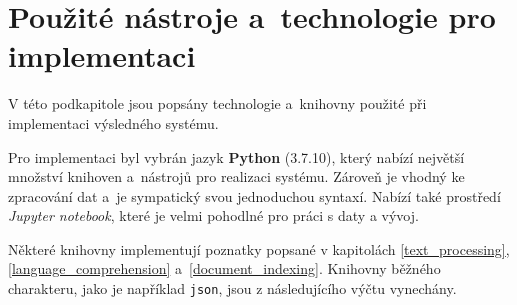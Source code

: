 \section{Použité nástroje a~technologie pro implementaci}
\label{pouzite_nastroje}
V této podkapitole jsou popsány technologie a~knihovny použité při implementaci výsledného systému.\par
Pro implementaci byl vybrán jazyk \textbf{Python} (3.7.10), který nabízí největší množství knihoven a~nástrojů pro realizaci systému. Zároveň je vhodný ke zpracování dat a~je sympatický svou jednoduchou syntaxí. Nabízí také prostředí \emph{Jupyter notebook}, které je velmi pohodlné pro práci s daty a vývoj.\par
Některé knihovny implementují poznatky popsané v kapitolách \ref{text_processing}, \ref{language_comprehension} a~\ref{document_indexing}. Knihovny běžného charakteru, jako je například \texttt{json}, jsou z následujícího výčtu vynechány.

